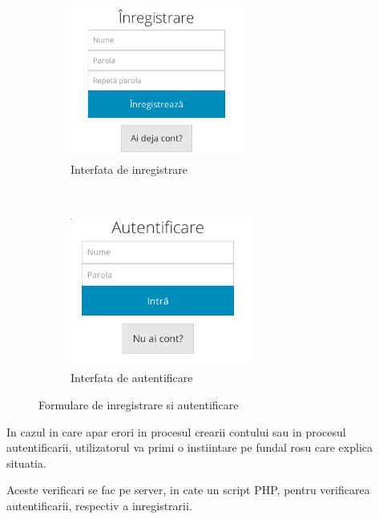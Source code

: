 \documentclass[12pt,a4paper]{article}
\begin{document}
\begin{figure}[h!]
        \centering
        \begin{subfigure}[b]{0.45\textwidth}
                \includegraphics[height=5cm]{img/inreg.png}
                \caption{Interfata de inregistrare}
        \end{subfigure}%
        ~ \qquad 
        \begin{subfigure}[b]{0.45\textwidth}
                \includegraphics[height=5cm]{img/auth.png}
                \caption{Interfata de autentificare}
        \end{subfigure}
        \caption{Formulare de inregistrare si autentificare}%
\end{figure}

 

In cazul in care apar erori in procesul crearii contului sau in procesul autentificarii,
utilizatorul va primi o instiintare pe fundal rosu care explica situatia.

Aceste verificari se fac pe server, in cate un script PHP, pentru verificarea autentificarii, respectiv a inregistrarii. 
\end{document}
